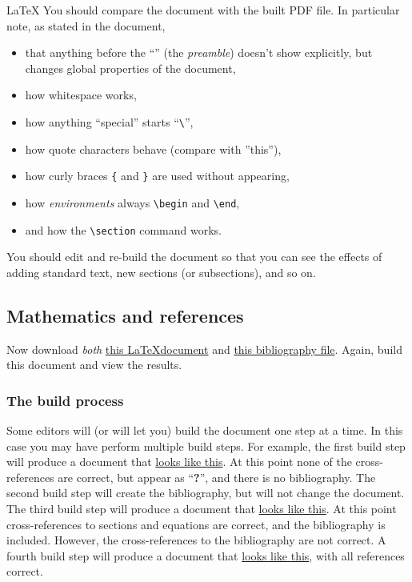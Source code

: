 \begin{chapter}{\LaTeX}
You should compare the document with the built PDF file. In particular note, as stated in the document,
%
\begin{itemize}
  \item that anything before the ``\verb||'' (the \emph{preamble}) doesn't show explicitly, but changes global properties of the document,
  \item how whitespace works,
  \item how anything ``special'' starts ``\verb|\|'',
  \item how quote characters behave (compare with ''this''),
  \item how curly braces \verb|{| and \verb|}| are used without
    appearing,
  \item how \emph{environments} always \verb|\begin| and
      \verb|\end|,
  \item and how the \verb|\section| command works.
\end{itemize}
%
You should edit and re-build the document so that you can see the effects of adding standard text, new sections (or subsections), and so on.

\subsection{Mathematics and references}

Now download \emph{both} \href{https://raw.githubusercontent.com/IanHawke/maths-with-python/master/latex/BasicLatexBibtex.tex}{this \LaTeX document} and \href{https://raw.githubusercontent.com/IanHawke/maths-with-python/master/latex/nummeth.bib}{this bibliography file}. Again, build this document and view the results.

\subsubsection{The build process}

Some editors will (or will let you) build the document one step at a time. In this case you may have perform multiple build steps. For example, the first build step will produce a document that \href{https://raw.githubusercontent.com/IanHawke/maths-with-python/master/latex/BasicLatexBibtex_pass1.pdf}{looks like this}. At this point none of the cross-references are correct, but appear as ``\textbf{?}'', and there is no bibliography. The second build step will create the bibliography, but will not change the document. The third build step will produce a document that \href{https://raw.githubusercontent.com/IanHawke/maths-with-python/master/latex/BasicLatexBibtex_pass2.pdf}{looks like this}. At this point cross-references to sections and equations are correct, and the bibliography is included. However, the cross-references to the bibliography are not correct. A fourth build step will produce a document that \href{https://raw.githubusercontent.com/IanHawke/maths-with-python/master/latex/BasicLatexBibtex_pass3.pdf}{looks like this}, with all references correct.


\end{chapter}
